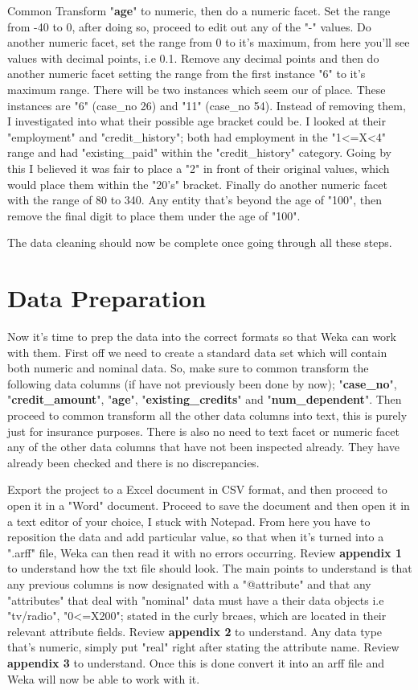\documentclass[10pt, a4paper]{article}
\begin{document}
    Common Transform "\textbf{age}" to numeric, then do a numeric facet. Set the range from -40 to 0, after doing so, proceed to edit out any of the "-" values. Do another numeric facet, set the range from 0 to it's maximum, from here you'll see values with decimal points, i.e 0.1. Remove any decimal points and then do another numeric facet setting the range from the first instance "6" to it's maximum range. There will be two instances which seem our of place. These instances are "6" (case\_no 26) and "11" (case\_no 54). Instead of removing them, I investigated into what their possible age bracket could be. I looked at their "employment" and "credit\_history"; both had employment in the "1<=X<4" range and had "existing\_paid" within the "credit\_history" category. Going by this I believed it was fair to place a "2" in front of their original values, which would place them within the "20's" bracket. Finally do another numeric facet with the range of  80 to 340. Any entity that's beyond the age of "100", then remove the final digit to place them under the age of "100".
    
    The data cleaning should now be complete once going through all these steps.
    
    \section{Data Preparation}
    Now it's time to prep the data into the correct formats so that Weka can work with them. First off we need to create a standard data set which will contain both numeric and nominal data. So, make sure to common transform the following data columns (if have not previously been done by now); "\textbf{case\_no}", "\textbf{credit\_amount}", "\textbf{age}", "\textbf{existing\_credits}" and "\textbf{num\_dependent}". Then proceed to common transform all the other data columns into text, this is purely just for insurance purposes. There is also no need to text facet or numeric facet any of the other data columns that have not been inspected already. They have already been checked and there is no discrepancies.
    
    Export the project to a Excel document in CSV format, and then proceed to open it in a "Word" document. Proceed to save the document and then open it in a text editor of your choice, I stuck with Notepad. From here you have to reposition the data and add particular value, so that when it's turned into a ".arff" file, Weka can then read it with no errors occurring. Review \textbf{appendix 1} to understand how the txt file should look. The main points to understand is that any previous columns is now designated with a "@attribute" and that any "attributes" that deal with "nominal" data must have a their data objects i.e "tv/radio", "0<=X200"; stated in the curly brcaes, which are located in their relevant attribute fields. Review \textbf{appendix 2} to understand. Any data type that's numeric, simply put "real" right after stating the attribute name. Review \textbf{appendix 3} to understand. Once this is done convert it into an arff file and Weka will now be able to work with it.
    
\end{document}
